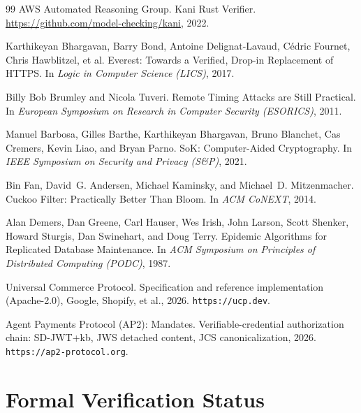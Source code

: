 \documentclass[11pt,a4paper]{article}
\theoremstyle{definition}
\begin{document}
\begin{thebibliography}{99}
AWS Automated Reasoning Group.
\newblock Kani Rust Verifier.
\newblock \url{https://github.com/model-checking/kani}, 2022.

Karthikeyan Bhargavan, Barry Bond, Antoine Delignat-Lavaud, Cédric Fournet, Chris Hawblitzel, et al.
\newblock Everest: Towards a Verified, Drop-in Replacement of HTTPS.
\newblock In \textit{Logic in Computer Science (LICS)}, 2017.

Billy Bob Brumley and Nicola Tuveri.
\newblock Remote Timing Attacks are Still Practical.
\newblock In \textit{European Symposium on Research in Computer Security (ESORICS)}, 2011.

Manuel Barbosa, Gilles Barthe, Karthikeyan Bhargavan, Bruno Blanchet, Cas Cremers, Kevin Liao, and Bryan Parno.
\newblock SoK: Computer-Aided Cryptography.
\newblock In \textit{IEEE Symposium on Security and Privacy (S\&P)}, 2021.

Bin Fan, David~G. Andersen, Michael Kaminsky, and Michael~D. Mitzenmacher.
\newblock Cuckoo Filter: Practically Better Than Bloom.
\newblock In \textit{ACM CoNEXT}, 2014.

Alan Demers, Dan Greene, Carl Hauser, Wes Irish, John Larson, Scott Shenker, Howard Sturgis, Dan Swinehart, and Doug Terry.
\newblock Epidemic Algorithms for Replicated Database Maintenance.
\newblock In \textit{ACM Symposium on Principles of Distributed Computing (PODC)}, 1987.

Universal Commerce Protocol.
\newblock Specification and reference implementation (Apache-2.0), Google, Shopify, et al., 2026.
\newblock \texttt{https://ucp.dev}.

Agent Payments Protocol (AP2): Mandates.
\newblock Verifiable-credential authorization chain: SD-JWT+kb, JWS detached content, JCS canonicalization, 2026.
\newblock \texttt{https://ap2-protocol.org}.

\end{thebibliography}

\appendix

\section{Formal Verification Status}\label{app:anchor-mech}
\end{document}
